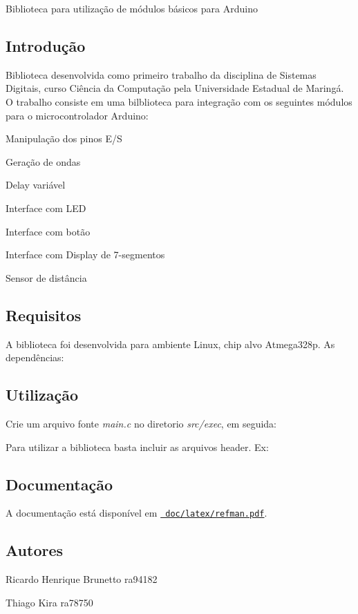 Biblioteca para utilização de módulos básicos para Arduino

\subsection*{Introdução}

Biblioteca desenvolvida como primeiro trabalho da disciplina de Sistemas Digitais, curso Ciência da Computação pela Universidade Estadual de Maringá. O trabalho consiste em uma bilblioteca para integração com os seguintes módulos para o microcontrolador Arduino\+:


\begin{DoxyItemize}
\item Manipulação dos pinos E/S
\item Geração de ondas
\item Delay variável
\item Interface com L\+ED
\item Interface com botão
\item Interface com Display de 7-\/segmentos
\item Sensor de distância
\end{DoxyItemize}

\subsection*{Requisitos}

A biblioteca foi desenvolvida para ambiente Linux, chip alvo Atmega328p. As dependências\+:


\begin{DoxyCode}{0}
\end{DoxyCode}


\subsection*{Utilização}

Crie um arquivo fonte {\itshape main.\+c} no diretorio {\itshape src/exec}, em seguida\+: 
\begin{DoxyCode}{0}
\end{DoxyCode}


Para utilizar a biblioteca basta incluir as arquivos header. Ex\+:


\begin{DoxyCode}{0}
\end{DoxyCode}


\subsection*{Documentação}

A documentação está disponível em \href{doc/latex/refman.pdf}\texttt{ doc/latex/refman.\+pdf}.

\subsection*{Autores}

Ricardo Henrique Brunetto ra94182

Thiago Kira ra78750 